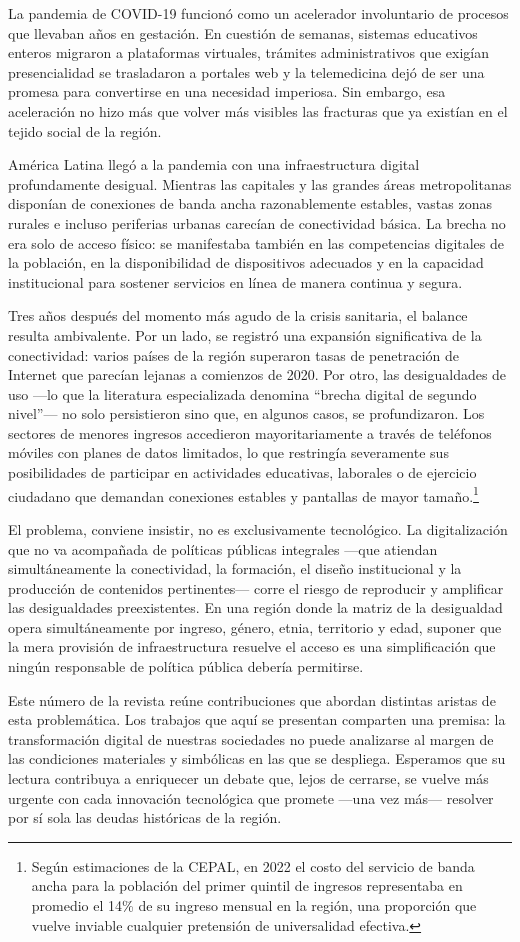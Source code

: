 \documentclass{article}
\begin{document}
La pandemia de COVID-19 funcionó como un acelerador involuntario de procesos que llevaban años en gestación. En cuestión de semanas, sistemas educativos enteros migraron a plataformas virtuales, trámites administrativos que exigían presencialidad se trasladaron a portales web y la telemedicina dejó de ser una promesa para convertirse en una necesidad imperiosa. Sin embargo, esa aceleración no hizo más que volver más visibles las fracturas que ya existían en el tejido social de la región.

América Latina llegó a la pandemia con una infraestructura digital profundamente desigual. Mientras las capitales y las grandes áreas metropolitanas disponían de conexiones de banda ancha razonablemente estables, vastas zonas rurales e incluso periferias urbanas carecían de conectividad básica. La brecha no era solo de acceso físico: se manifestaba también en las competencias digitales de la población, en la disponibilidad de dispositivos adecuados y en la capacidad institucional para sostener servicios en línea de manera continua y segura.

Tres años después del momento más agudo de la crisis sanitaria, el balance resulta ambivalente. Por un lado, se registró una expansión significativa de la conectividad: varios países de la región superaron tasas de penetración de Internet que parecían lejanas a comienzos de 2020. Por otro, las desigualdades de uso —lo que la literatura especializada denomina “brecha digital de segundo nivel”— no solo persistieron sino que, en algunos casos, se profundizaron. Los sectores de menores ingresos accedieron mayoritariamente a través de teléfonos móviles con planes de datos limitados, lo que restringía severamente sus posibilidades de participar en actividades educativas, laborales o de ejercicio ciudadano que demandan conexiones estables y pantallas de mayor tamaño.\footnote{Según estimaciones de la CEPAL, en 2022 el costo del servicio de
banda ancha para la población del primer quintil de ingresos
representaba en promedio el 14\% de su ingreso mensual en la región, una
proporción que vuelve inviable cualquier pretensión de universalidad
efectiva.}

El problema, conviene insistir, no es exclusivamente tecnológico. La digitalización que no va acompañada de políticas públicas integrales —que atiendan simultáneamente la conectividad, la formación, el diseño institucional y la producción de contenidos pertinentes— corre el riesgo de reproducir y amplificar las desigualdades preexistentes. En una región donde la matriz de la desigualdad opera simultáneamente por ingreso, género, etnia, territorio y edad, suponer que la mera provisión de infraestructura resuelve el acceso es una simplificación que ningún responsable de política pública debería permitirse.

Este número de la revista reúne contribuciones que abordan distintas aristas de esta problemática. Los trabajos que aquí se presentan comparten una premisa: la transformación digital de nuestras sociedades no puede analizarse al margen de las condiciones materiales y simbólicas en las que se despliega. Esperamos que su lectura contribuya a enriquecer un debate que, lejos de cerrarse, se vuelve más urgente con cada innovación tecnológica que promete —una vez más— resolver por sí sola las deudas históricas de la región.
\end{document}
